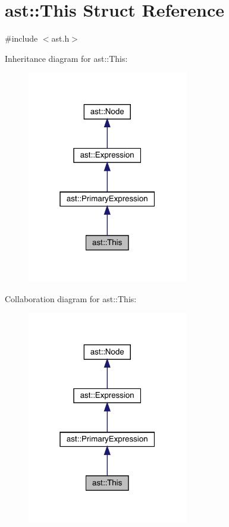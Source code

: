 \hypertarget{structast_1_1_this}{}\section{ast\+:\+:This Struct Reference}
\label{structast_1_1_this}


{\ttfamily \#include $<$ast.\+h$>$}



Inheritance diagram for ast\+:\+:This\+:\nopagebreak
\begin{figure}[H]
\begin{center}
\leavevmode
\includegraphics[width=199pt]{structast_1_1_this__inherit__graph}
\end{center}
\end{figure}


Collaboration diagram for ast\+:\+:This\+:\nopagebreak
\begin{figure}[H]
\begin{center}
\leavevmode
\includegraphics[width=199pt]{structast_1_1_this__coll__graph}
\end{center}
\end{figure}

